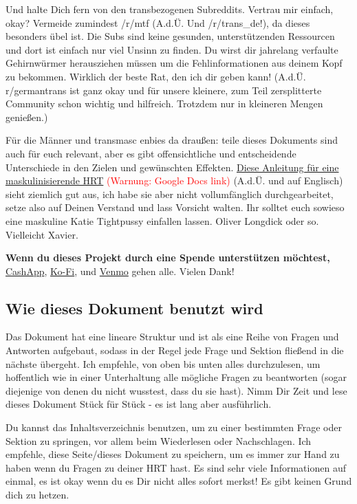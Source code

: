 \documentclass{article}
\begin{document}
Und halte Dich fern von den transbezogenen Subreddits. Vertrau mir einfach, okay? Vermeide zumindest /r/mtf (A.d.Ü. Und /r/trans\_de!), da dieses besonders übel ist. Die Subs sind keine gesunden, unterstützenden Ressourcen und dort ist einfach nur viel Unsinn zu finden. Du wirst dir jahrelang verfaulte Gehirnwürmer herausziehen müssen um die Fehlinformationen aus deinem Kopf zu bekommen. Wirklich der beste Rat, den ich dir geben kann! (A.d.Ü. r/germantrans ist ganz okay und für unsere kleinere, zum Teil zersplitterte Community schon wichtig und hilfreich. Trotzdem nur in kleineren Mengen genießen.)

Für die Männer und transmasc enbies da draußen: teile dieses Dokuments sind auch für euch relevant, aber es gibt offensichtliche und entscheidende Unterschiede in den Zielen und gewünschten Effekten. \href{https://docs.google.com/document/d/1DXFxzN0XTudPZez\_SO61fpqncRLPH\_Be\_QG\_8Pcz9LU/edit?tab=t.0}{Diese Anleitung für eine maskulinisierende HRT} \textcolor{red}{(Warnung: Google Docs link)} (A.d.Ü. und auf Englisch) sieht ziemlich gut aus, ich habe sie aber nicht vollumfänglich durchgearbeitet, setze also auf Deinen Verstand und lass Vorsicht walten. Ihr solltet euch sowieso eine maskuline Katie Tightpussy einfallen lassen. Oliver Longdick oder so. Vielleicht Xavier. 

\textbf{Wenn du dieses Projekt durch eine Spende unterstützen möchtest,} \href{https://cash.app/Katitties}{CashApp}, \href{https://ko-fi.com/katitties}{Ko-Fi}, und \href{https://account.venmo.com/u/katitties}{Venmo} gehen alle. Vielen Dank!

\subsection*{Wie dieses Dokument benutzt wird}

Das Dokument hat eine lineare Struktur und ist als eine Reihe von Fragen und Antworten aufgebaut, sodass in der Regel jede Frage und Sektion fließend in die nächste übergeht. Ich empfehle, von oben bis unten alles durchzulesen, um hoffentlich wie in einer Unterhaltung alle mögliche Fragen zu beantworten (sogar diejenige von denen du nicht wusstest, dass du sie hast). Nimm Dir Zeit und lese dieses Dokument Stück für Stück - es ist lang aber ausführlich.

Du kannst das Inhaltsverzeichnis benutzen, um zu einer bestimmten Frage oder Sektion zu springen, vor allem beim Wiederlesen oder Nachschlagen. Ich empfehle, diese Seite/dieses Dokument zu speichern, um es immer zur Hand zu haben wenn du Fragen zu deiner HRT hast. Es sind sehr viele Informationen auf einmal, es ist okay wenn du es  Dir nicht alles sofort merkst! Es gibt keinen Grund dich zu hetzen. 
\end{document}
